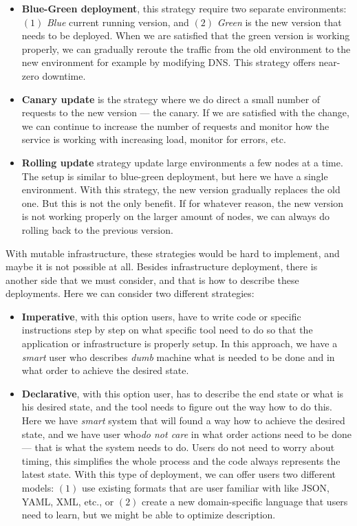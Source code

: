 \begin{itemize}
	\item \textbf{Blue-Green deployment}, this strategy require two separate environments: $(1)$ \textit{Blue} current running version, and $(2)$ \textit{Green} is the new version that needs to be deployed. When we are satisfied that the green version is working properly, we can gradually reroute the traffic from the old environment to the new environment for example by modifying DNS. This strategy offers near-zero downtime.
	\item \textbf{Canary update} is the strategy where we do direct a small number of requests to the new version --- the canary. If we are satisfied with the change, we can continue to increase the number of requests and monitor how the service is working with increasing load, monitor for errors, etc.
	\item \textbf{Rolling update} strategy update large environments a few nodes at a time. The setup is similar to blue-green deployment, but here we have a single environment. With this strategy, the new version gradually replaces the old one. But this is not the only benefit. If for whatever reason, the new version is not working properly on the larger amount of nodes, we can always do rolling back to the previous version.
\end{itemize}

With mutable infrastructure, these strategies would be hard to implement, and maybe it is not possible at all. Besides infrastructure deployment, there is another side that we must consider, and that is how to describe these deployments. Here we can consider two different strategies:

\begin{itemize}
	\item \textbf{Imperative}, with this option users, have to write code or specific instructions step by step on what specific tool need to do so that the application or infrastructure is properly setup. In this approach, we have a \textit{smart} user who describes \textit{dumb} machine what is needed to be done and in what order to achieve the desired state.
	\item \textbf{Declarative}, with this option user, has to describe the end state or what is his desired state, and the tool needs to figure out the way how to do this. Here we have \textit{smart} system that will found a way how to achieve the desired state, and we have user who\textit{do not care} in what order actions need to be done --- that is what the system needs to do. Users do not need to worry about timing, this simplifies the whole process and the code always represents the latest state. With this type of deployment, we can offer users two different models: $(1)$ use existing formats that are user familiar with like JSON, YAML, XML, etc., or $(2)$ create a new domain-specific language that users need to learn, but we might be able to optimize description.
\end{itemize}

